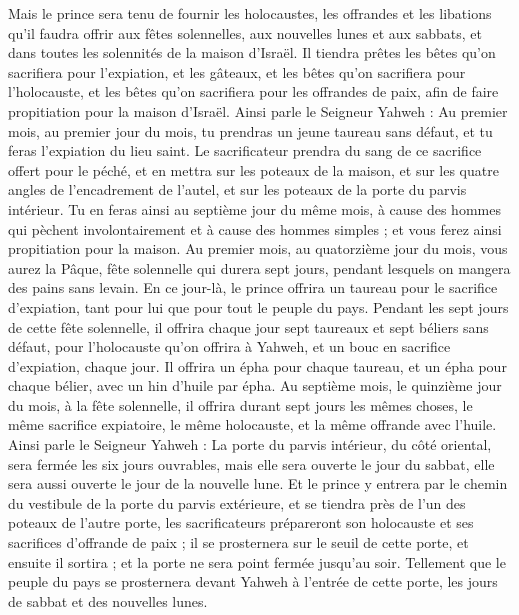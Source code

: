 \begin{multicols}{2}
Mais le prince sera tenu de fournir les holocaustes, les offrandes et les libations qu'il faudra offrir aux fêtes solennelles, aux nouvelles lunes et aux sabbats, et dans toutes les solennités de la maison d'Israël. Il tiendra prêtes les bêtes qu'on sacrifiera pour l'expiation, et les gâteaux, et les bêtes qu'on sacrifiera pour l'holocauste, et les bêtes qu'on sacrifiera pour les offrandes de paix, afin de faire propitiation pour la maison d'Israël.
Ainsi parle le Seigneur Yahweh : Au premier mois, au premier jour du mois, tu prendras un jeune taureau sans défaut, et tu feras l'expiation du lieu saint.
Le sacrificateur prendra du sang de ce sacrifice offert pour le péché, et en mettra sur les poteaux de la maison, et sur les quatre angles de l'encadrement de l'autel, et sur les poteaux de la porte du parvis intérieur.
Tu en feras ainsi au septième jour du même mois, à cause des hommes qui pèchent involontairement et à cause des hommes simples ; et vous ferez ainsi propitiation pour la maison.
Au premier mois, au quatorzième jour du mois, vous aurez la Pâque, fête solennelle qui durera sept jours, pendant lesquels on mangera des pains sans levain.
En ce jour-là, le prince offrira un taureau pour le sacrifice d'expiation, tant pour lui que pour tout le peuple du pays.
Pendant les sept jours de cette fête solennelle, il offrira chaque jour sept taureaux et sept béliers sans défaut, pour l'holocauste qu'on offrira à Yahweh, et un bouc en sacrifice d'expiation, chaque jour.
Il offrira un épha pour chaque taureau, et un épha pour chaque bélier, avec un hin d'huile par épha.
Au septième mois, le quinzième jour du mois, à la fête solennelle, il offrira durant sept jours les mêmes choses, le même sacrifice expiatoire, le même holocauste, et la même offrande avec l'huile.
\VerseOne{}Ainsi parle le Seigneur Yahweh : La porte du parvis intérieur, du côté oriental, sera fermée les six jours ouvrables, mais elle sera ouverte le jour du sabbat, elle sera aussi ouverte le jour de la nouvelle lune.
Et le prince y entrera par le chemin du vestibule de la porte du parvis extérieure, et se tiendra près de l'un des poteaux de l'autre porte, les sacrificateurs prépareront son holocauste et ses sacrifices d'offrande de paix ; il se prosternera sur le seuil de cette porte, et ensuite il sortira ; et la porte ne sera point fermée jusqu'au soir.
Tellement que le peuple du pays se prosternera devant Yahweh à l'entrée de cette porte, les jours de sabbat et des nouvelles lunes.

\end{multicols}
